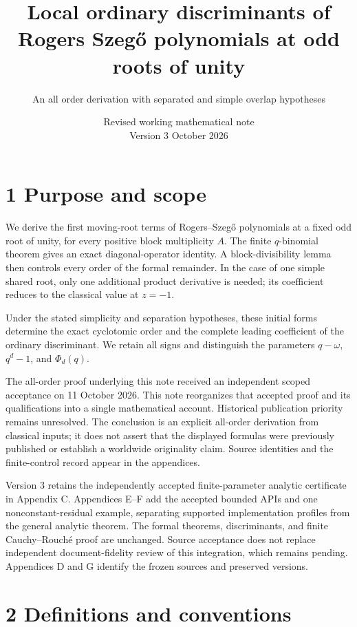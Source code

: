 \documentclass[
  11pt,
]{article}
\title{Local ordinary discriminants of Rogers Szegő polynomials at odd
roots of unity}
\subtitle{An all order derivation with separated and simple overlap
hypotheses}
\author{}
\date{Revised working mathematical note\\Version 3 \quad 11 October 2026}
\begin{document}
\maketitle

\section{1 Purpose and scope}\label{purpose-and-scope}

We derive the first moving-root terms of Rogers--Szegő polynomials at a
fixed odd root of unity, for every positive block multiplicity \(A\).
The finite \(q\)-binomial theorem gives an exact diagonal-operator
identity. A block-divisibility lemma then controls every order of the
formal remainder. In the case of one simple shared root, only one
additional product derivative is needed; its coefficient reduces to the
classical value at \(z=-1\).

Under the stated simplicity and separation hypotheses, these initial
forms determine the exact cyclotomic order and the complete leading
coefficient of the ordinary discriminant. We retain all signs and
distinguish the parameters \(q-\omega\), \(q^d-1\), and \(\Phi_d(q)\).

The all-order proof underlying this note received an independent scoped
acceptance on 11 October 2026. This note reorganizes that accepted proof
and its qualifications into a single mathematical account. Historical
publication priority remains unresolved. The conclusion is an explicit
all-order derivation from classical inputs; it does not assert that the
displayed formulas were previously published or establish a worldwide
originality claim. Source identities and the finite-control record
appear in the appendices.

Version 3 retains the independently accepted finite-parameter analytic
certificate in Appendix C. Appendices E--F add the accepted bounded APIs
and one nonconstant-residual example, separating supported implementation
profiles from the general analytic theorem. The formal theorems,
discriminants, and finite Cauchy--Rouch\'e proof are unchanged.
Source acceptance does not replace independent document-fidelity review
of this integration, which remains pending. Appendices D and G identify
the frozen sources and preserved versions.

\section{2 Definitions and
conventions}\label{definitions-and-conventions}
\end{document}
